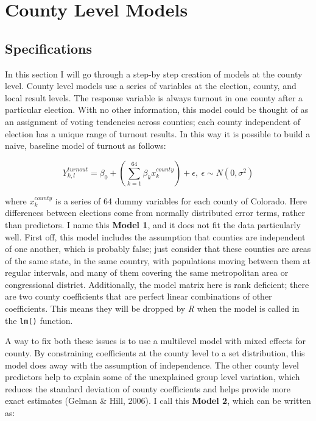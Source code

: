 \documentclass[12pt,twoside]{reedthesis}
\begin{document}
  \section{County Level Models}\label{county-level-models}
  
  \subsection{Specifications}\label{specifications}
  
  In this section I will go through a step-by step creation of models at
  the county level. County level models use a series of variables at the
  election, county, and local result levels. The response variable is
  always turnout in one county after a particular election. With no other
  information, this model could be thought of as an assignment of voting
  tendencies across counties; each county independent of election has a
  unique range of turnout results. In this way it is possible to build a
  naive, baseline model of turnout as follows:
  
  \begin{equation} \tag{Model 1}
  Y^{turnout}_{k,l} = \beta_0 + (\sum_{k=1}^{64}\beta_kx_k^{county}) + \epsilon,\ \epsilon \sim N(0,\sigma^2)
  \end{equation}
  
  where \(x_k^{county}\) is a series of 64 dummy variables for each county
  of Colorado. Here differences between elections come from normally
  distributed error terms, rather than predictors. I name this
  \textbf{Model 1}, and it does not fit the data particularly well. First
  off, this model includes the assumption that counties are independent of
  one another, which is probably false; just consider that these counties
  are areas of the same state, in the same country, with populations
  moving between them at regular intervals, and many of them covering the
  same metropolitan area or congressional district. Additionally, the
  model matrix here is rank deficient; there are two county coefficients
  that are perfect linear combinations of other coefficients. This means
  they will be dropped by \textit{R} when the model is called in the
  \texttt{lm()} function.
  
  A way to fix both these issues is to use a multilevel model with mixed
  effects for county. By constraining coefficients at the county level to
  a set distribution, this model does away with the assumption of
  independence. The other county level predictors help to explain some of
  the unexplained group level variation, which reduces the standard
  deviation of county coefficients and helps provide more exact estimates
  (Gelman \& Hill, 2006). I call this \textbf{Model 2}, which can be
  written as:
  
\end{document}
